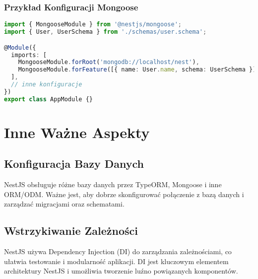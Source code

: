 \documentclass[a4paper,12pt]{article}
\begin{document}
\subsubsection{Przykład Konfiguracji Mongoose}
\begin{lstlisting}[language=TypeScript, caption=Konfiguracja Mongoose w NestJS]
import { MongooseModule } from '@nestjs/mongoose';
import { User, UserSchema } from './schemas/user.schema';

@Module({
  imports: [
    MongooseModule.forRoot('mongodb://localhost/nest'),
    MongooseModule.forFeature([{ name: User.name, schema: UserSchema }]),
  ],
  // inne konfiguracje
})
export class AppModule {}
\end{lstlisting}

\section{Inne Ważne Aspekty}
\subsection{Konfiguracja Bazy Danych}
NestJS obsługuje różne bazy danych przez TypeORM, Mongoose i inne ORM/ODM. Ważne jest, aby dobrze skonfigurować połączenie z bazą danych i zarządzać migracjami oraz schematami.

\subsection{Wstrzykiwanie Zależności}
NestJS używa Dependency Injection (DI) do zarządzania zależnościami, co ułatwia testowanie i modularność aplikacji. DI jest kluczowym elementem architektury NestJS i umożliwia tworzenie luźno powiązanych komponentów.
\end{document}
